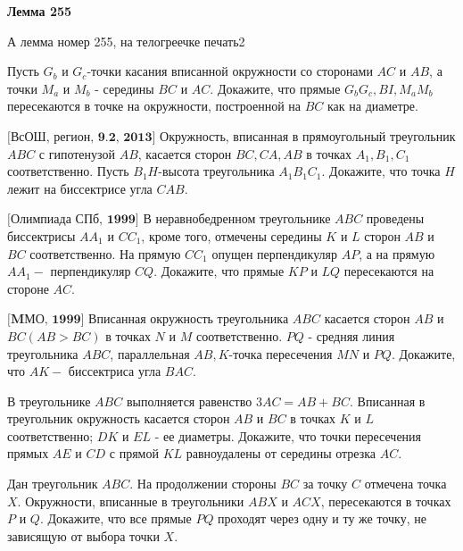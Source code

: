 \centerline{\bf \Huge Лемма 255}
\centerline{\bf \Huge }

\begin{flushright}
        \scriptsize{А лемма номер 255, на телогреечке печать2}
\end{flushright}

Пусть $G_b$ и $G_c$-точки касания вписанной окружности со сторонами $A C$ и $A B$, а точки $M_a$ и $M_b$ - середины $B C$ и $A C$. Докажите, что прямые $G_b G_c, B I, M_a M_b$ пересекаются в точке на окружности, построенной на $B C$ как на диаметре.

$\bigl[\textbf{ВсОШ, регион, 9.2, 2013}\bigr]$
 Окружность, вписанная в прямоугольный треугольник $A B C$ с гипотенузой $A B$, касается сторон $B C, C A, A B$ в точках $A_1, B_1, C_1$ соответственно. Пусть $B_1 H$-высота треугольника $A_1 B_1 C_1$. Докажите, что точка $H$ лежит на биссектрисе угла $C A B$.

$\bigl[\textbf{Олимпиада СПб, 1999}\bigr]$
 В неравнобедренном треугольнике $A B C$ проведены биссектрисы $A A_1$ и $C C_1$, кроме того, отмечены середины $K$ и $L$ сторон $A B$ и $B C$ соответственно. На прямую $C C_1$ опущен перпендикуляр $A P$, а на прямую $A A_1-$ перпендикуляр $C Q$. Докажите, что прямые $K P$ и $L Q$ пересекаются на стороне $A C$.

$\bigl[\textbf{MМО, 1999}\bigr]$
Вписанная окружность треугольника $A B C$ касается сторон $A B$ и $B C(A B>B C)$ в точках $N$ и $M$ соответственно. $P Q$ - средняя линия треугольника $A B C$, параллельная $A B, K$-точка пересечения $M N$ и $P Q$. Докажите, что $A K-$ биссектриса угла $B A C$.

В треугольнике $A B C$ выполняется равенство $3 A C=A B+B C$. Вписанная в треугольник окружность касается сторон $A B$ и $B C$ в точках $K$ и $L$ соответственно; $D K$ и $E L$ - ее диаметры. Докажите, что точки пересечения прямых $A E$ и $C D$ с прямой $K L$ равноудалены от середины отрезка $A C$.

Дан треугольник $A B C$. На продолжении стороны $B C$ за точку $C$ отмечена точка $X$. Окружности, вписанные в треугольники $A B X$ и $A C X$, пересекаются в точках $P$ и $Q$. Докажите, что все прямые $P Q$ проходят через одну и ту же точку, не зависящую от выбора точки $X$.
